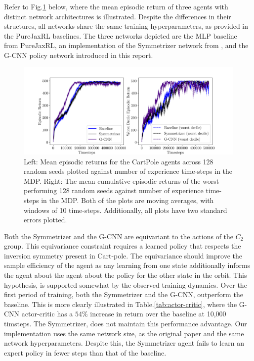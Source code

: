 Refer to Fig.\ref{fig:cp_equi_ac} below, where the mean episodic return of three agents with distinct network architectures is illustrated. Despite the differences in their structures, all networks share the same training hyperparameters, as provided in the PureJaxRL\cite{lu2022discovered} baselines. The three networks depicted are the MLP baseline from PureJaxRL, an implementation of the Symmetrizer network from \cite{vanderpol2020mdp}, and the G-CNN policy network introduced in this report.

\begin{figure}[h!]
	\begin{center}
		\includegraphics[width=\linewidth]{Figures/cart_pole_returns.png}
		\caption{Left: Mean episodic returns for the CartPole agents across 128 random seeds plotted against number of experience time-steps in the MDP. Right: The mean cumulative episodic returns of the worst performing 128 random seeds against number of experience time-steps in the MDP. Both of the plots are moving averages, with windows of 10 time-steps. Additionally, all plots have two standard errors plotted. }
		\label{fig:cp_equi_ac}
	\end{center}
\end{figure}

Both the Symmetrizer and the G-CNN are equivariant to the actions of the $C_2$ group. This equivariance constraint requires a learned policy that respects the inversion symmetry present in Cart-pole. The equivariance  should improve the sample efficiency of the agent as any learning from one state additionally informs the agent about the agent about the policy for the other state in the orbit. This hypothesis, is supported somewhat by the observed training dynamics. Over the first period of training, both the Symmetrizer and the G-CNN, outperform the baseline. This is more clearly illustrated in Table.\ref{tab:actor-critic}, where the G-CNN actor-critic has a $54\%$ increase in return over the baseline at 10,000 timsteps. The Symmetrizer, does not maintain this performance advantage. Our implementation uses the same network size, as the original paper and the same network hyperparameters. Despite this, the Symmetrizer agent fails to learn an expert policy in fewer steps than that of the baseline.

